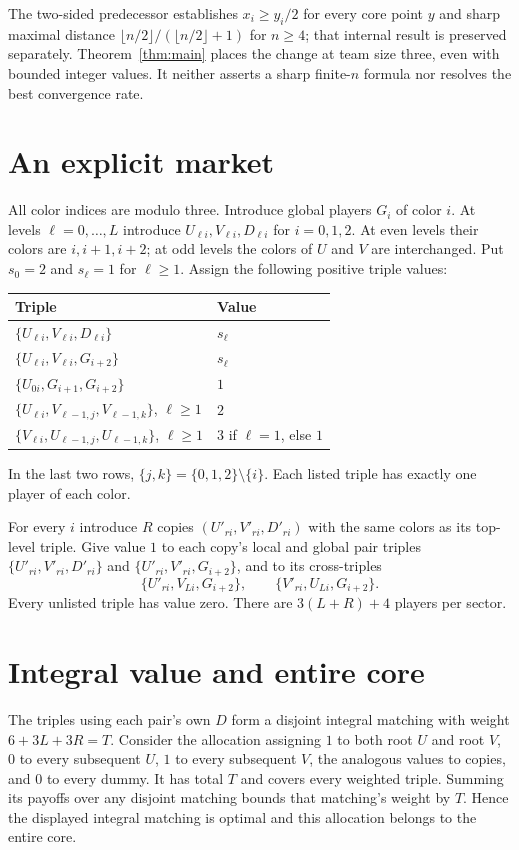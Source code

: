 \documentclass[11pt]{article}
\begin{document}
The two-sided predecessor establishes $x_i\ge y_i/2$ for every core point $y$
and sharp maximal distance $\lfloor n/2\rfloor/(\lfloor n/2\rfloor+1)$ for
$n\ge4$; that internal result is preserved separately. Theorem~\ref{thm:main}
places the change at team size three, even with bounded integer values.
It neither asserts a sharp finite-$n$ formula nor resolves the best convergence rate.

\section{An explicit market}
All color indices are modulo three. Introduce global players $G_i$ of color
$i$. At levels $\ell=0,\ldots,L$ introduce $U_{\ell i},V_{\ell i},D_{\ell i}$
for $i=0,1,2$. At even levels their colors are $i,i+1,i+2$; at odd levels
the colors of $U$ and $V$ are interchanged. Put $s_0=2$ and $s_\ell=1$
for $\ell\ge1$. Assign the following positive triple values:
\begin{center}
\begin{tabular}{ll}
\toprule
Triple & Value\\
\midrule
$\{U_{\ell i},V_{\ell i},D_{\ell i}\}$ & $s_\ell$\\
$\{U_{\ell i},V_{\ell i},G_{i+2}\}$ & $s_\ell$\\
$\{U_{0i},G_{i+1},G_{i+2}\}$ & $1$\\
$\{U_{\ell i},V_{\ell-1,j},V_{\ell-1,k}\}$, $\ell\ge1$ & $2$\\
$\{V_{\ell i},U_{\ell-1,j},U_{\ell-1,k}\}$, $\ell\ge1$ & $3$ if $\ell=1$, else $1$\\
\bottomrule
\end{tabular}
\end{center}
In the last two rows, $\{j,k\}=\{0,1,2\}\setminus\{i\}$.
Each listed triple has exactly one player of each color.

For every $i$ introduce $R$ copies $(U'_{ri},V'_{ri},D'_{ri})$ with the same
colors as its top-level triple. Give value $1$ to each copy's local and global
pair triples $\{U'_{ri},V'_{ri},D'_{ri}\}$ and
$\{U'_{ri},V'_{ri},G_{i+2}\}$, and to its cross-triples
\[
 \{U'_{ri},V_{Li},G_{i+2}\},\qquad
 \{V'_{ri},U_{Li},G_{i+2}\}.
\]
Every unlisted triple has value zero. There are $3(L+R)+4$ players per sector.

\section{Integral value and entire core}
The triples using each pair's own $D$ form a disjoint integral matching with
weight $6+3L+3R=T$. Consider the allocation assigning $1$ to both root
$U$ and root $V$, $0$ to every subsequent $U$, $1$ to every subsequent $V$,
the analogous values to copies, and $0$ to every dummy. It has total $T$
and covers every weighted triple. Summing its payoffs over any disjoint
matching bounds that matching's weight by $T$. Hence the displayed integral
matching is optimal and this allocation belongs to the entire core.
\end{document}

